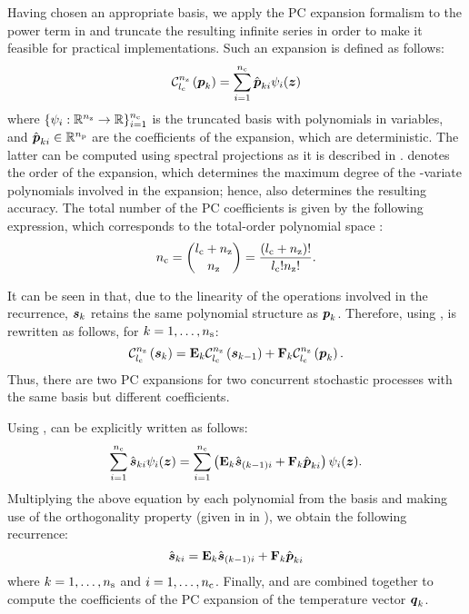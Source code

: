 Having chosen an appropriate basis, we apply the PC expansion formalism to the
power term in  and truncate the resulting infinite series in
order to make it feasible for practical implementations. Such an expansion is
defined as follows:
\begin{equation} \elab{pc-expansion}
  \chaos{\nz}{\lc}{\vp_k} = \sum_{i = 1}^{\nc} \hat{\vp}_{ki} \psi_i(\vz)
\end{equation}
where $\{ \psi_i: \mathbb{R}^{n_\mathrm{z}} \to \mathbb{R} \}_{i = 1}^{{n_\mathrm{c}}}$ is the truncated
basis with \nc polynomials in \nz variables, and $\hat{\boldsymbol{p}}_{ki} \in \mathbb{R}^{n_\mathrm{p}}$
are the coefficients of the expansion, which are deterministic. The latter can
be computed using spectral projections as it is described in
. \lc denotes the order of the expansion, which determines
the maximum degree of the \nz-variate polynomials involved in the expansion;
hence, \lc also determines the resulting accuracy. The total number of the PC
coefficients \nc is given by the following expression, which corresponds to the
total-order polynomial space \cite{eldred2008, beck2011}:
\begin{equation} \elab{pc-terms}
  \nc = { \lc + \nz \choose \nz } = \frac{(\lc + \nz)!}{\lc! \nz!}.
\end{equation}

It can be seen in  that, due to the linearity of the operations
involved in the recurrence, $\boldsymbol{s}_k$ retains the same polynomial structure as
$\boldsymbol{p}_k$. Therefore, using ,  is rewritten as
follows, for $k = 1, \dots, {n_\mathrm{s}}$:
\begin{equation} \elab{expanded-recurrence}
  \chaos{\nz}{\lc}{\vs_k} = \m{E}_k \chaos{\nz}{\lc}{\vs_{k - 1}} + \m{F}_k
  \chaos{\nz}{\lc}{\vp_k}.
\end{equation}
Thus, there are two PC expansions for two concurrent stochastic processes with
the same basis but different coefficients.

Using ,  can be explicitly written
as follows:
\[
  \sum_{i = 1}^{{n_\mathrm{c}}} \hat{\boldsymbol{s}}_{ki} \psi_i(\boldsymbol{z}) = \sum_{i = 1}^{{n_\mathrm{c}}} \left( \mathbf{E}_k \hat{\boldsymbol{s}}_{(k - 1)i} + \mathbf{F}_k \hat{\boldsymbol{p}}_{ki} \right) \psi_i(\boldsymbol{z}).
\]
Multiplying the above equation by each polynomial from the basis and making use
of the orthogonality property (given in  in
), we obtain the following recurrence:
\begin{equation} \elab{pc-recurrence}
  \hat{\vs}_{ki} = \m{E}_k \hat{\vs}_{(k - 1)i} + \m{F}_k \hat{\vp}_{ki}
\end{equation}
where $k = 1, \dots, {n_\mathrm{s}}$ and $i = 1, \dots, {n_\mathrm{c}}$. Finally,
 and  are combined together to compute
the coefficients of the PC expansion of the temperature vector $\boldsymbol{q}_k$.

